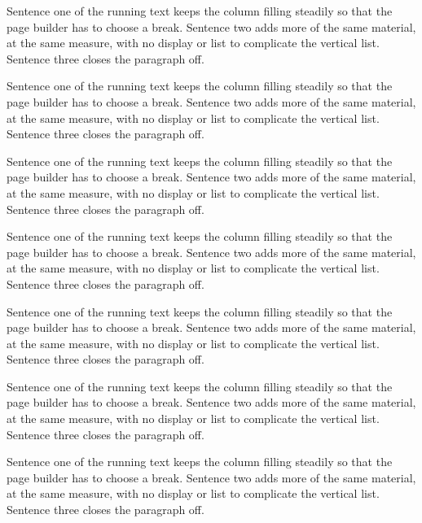 \documentclass{article}
\begin{document}
Sentence one of the running text keeps the column filling steadily so that the page builder has to choose a break. Sentence two adds more of the same material, at the same measure, with no display or list to complicate the vertical list. Sentence three closes the paragraph off.

Sentence one of the running text keeps the column filling steadily so that the page builder has to choose a break. Sentence two adds more of the same material, at the same measure, with no display or list to complicate the vertical list. Sentence three closes the paragraph off.

Sentence one of the running text keeps the column filling steadily so that the page builder has to choose a break. Sentence two adds more of the same material, at the same measure, with no display or list to complicate the vertical list. Sentence three closes the paragraph off.

Sentence one of the running text keeps the column filling steadily so that the page builder has to choose a break. Sentence two adds more of the same material, at the same measure, with no display or list to complicate the vertical list. Sentence three closes the paragraph off.

Sentence one of the running text keeps the column filling steadily so that the page builder has to choose a break. Sentence two adds more of the same material, at the same measure, with no display or list to complicate the vertical list. Sentence three closes the paragraph off.

Sentence one of the running text keeps the column filling steadily so that the page builder has to choose a break. Sentence two adds more of the same material, at the same measure, with no display or list to complicate the vertical list. Sentence three closes the paragraph off.

Sentence one of the running text keeps the column filling steadily so that the page builder has to choose a break. Sentence two adds more of the same material, at the same measure, with no display or list to complicate the vertical list. Sentence three closes the paragraph off.
\end{document}
